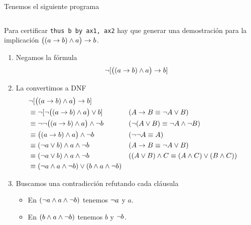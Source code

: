 \begin{ejemplo}
    Tenemos el siguiente programa

    \begin{figure}[H]
        \centering
        \begin{tabular}{c}
            
        \end{tabular}
    \end{figure}

    Para certificar \lstinline{thus b by ax1, ax2} hay que generar una
    demostración para la implicación $\big((a \to b) \wedge a \big)\to b$.

    \begin{enumerate}
        \item Negamos la fórmula 
        \[ \neg [ \big( (a \to b) \wedge a \big) \to b ] \]

        \item La convertimos a DNF
        \begin{align*}
            &\neg [ \big( (a \to b) \wedge a \big) \to b ] \\
            &\equiv \neg [ \neg \big( (a \to b) \wedge a \big) \vee b ]
                && (A \to B \equiv \neg A \vee B)\\
            &\equiv \neg \neg \big( (a \to b) \wedge a \big) \wedge \neg b
                && (\neg(A \vee B) \equiv \neg A \wedge \neg B)\\
            &\equiv \big( (a \to b) \wedge a \big) \wedge \neg b
                && (\neg\neg A \equiv A)\\
            &\equiv (\neg a \vee b) \wedge a \wedge \neg b
                 && (A \to B \equiv \neg A \vee B)\\
            &\equiv (\neg a \vee b) \wedge a \wedge \neg b
                && ((A \vee B) \wedge C \equiv (A \wedge C) \vee (B \wedge C))\\
            &\equiv
                (\neg a \wedge a \wedge \neg b)
                \vee
                (b \wedge a \wedge \neg b)
        \end{align*}

        \item Buscamos una contradicción refutando cada cláusula
        \begin{itemize}
            \item En $(\neg a \wedge a \wedge \neg b)$ tenemos $\neg a$ y $a$.
            \item En $(b \wedge a \wedge \neg b)$ tenemos $b$ y $\neg b$.
        \end{itemize}
    \end{enumerate}
\end{ejemplo}


